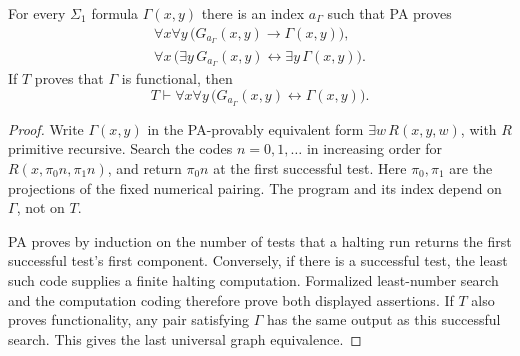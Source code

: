 \begin{lemma}\label{lem:syntactic-functional-search}
For every $\Sigma_1$ formula $\Gamma(x,y)$ there is an index
$a_\Gamma$ such that PA proves
\begin{gather*}
 \forall x\forall y\,
   \bigl(G_{a_\Gamma}(x,y)\longrightarrow\Gamma(x,y)\bigr),\\
 \forall x\,
   \bigl(\exists y\,G_{a_\Gamma}(x,y)
          \longleftrightarrow\exists y\,\Gamma(x,y)\bigr).
\end{gather*}
If $T$ proves that $\Gamma$ is functional, then
\[
 T\vdash\forall x\forall y\,
       \bigl(G_{a_\Gamma}(x,y)\longleftrightarrow\Gamma(x,y)\bigr).
\]
\end{lemma}
\begin{proof}
Write $\Gamma(x,y)$ in the PA-provably equivalent form
$\exists w\,R(x,y,w)$, with $R$ primitive recursive. Search the
codes $n=0,1,\ldots$ in increasing order for
$R(x,\pi_0n,\pi_1n)$, and return $\pi_0n$ at the first successful
test. Here $\pi_0,\pi_1$ are the projections of the fixed numerical
pairing. The program and its index depend on $\Gamma$, not on $T$.

PA proves by induction on the number of tests that a halting run
returns the first successful test's first component. Conversely,
if there is a successful test, the least such code supplies a finite
halting computation. Formalized least-number search and the
computation coding therefore prove both displayed assertions.
If $T$ also proves functionality, any pair satisfying $\Gamma$
has the same output as this successful search. This gives the
last universal graph equivalence.
\end{proof}

